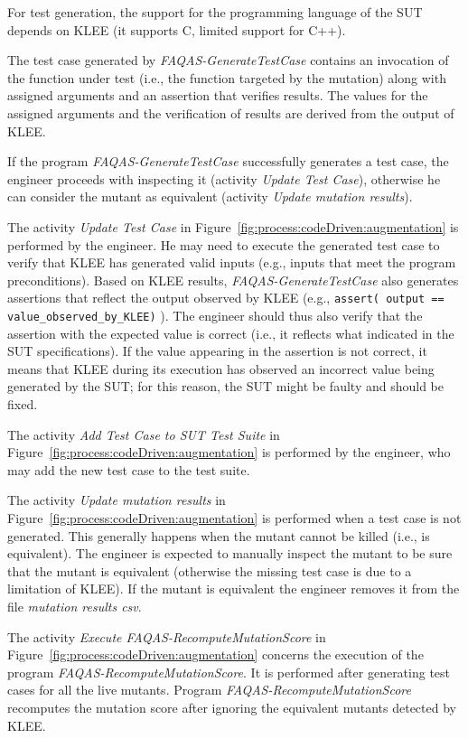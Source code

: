 For test generation, the support for the programming language of the SUT depends on KLEE (it supports C, limited support for C++).

The test case generated by \emph{FAQAS-GenerateTestCase} contains an invocation of the function under test (i.e., the function targeted  by the mutation) along with assigned arguments and an assertion that verifies results. The values for the assigned arguments and the verification of results are derived from the output of KLEE.

If the program \emph{FAQAS-GenerateTestCase} successfully generates a test case, the engineer proceeds with inspecting it (activity \emph{Update Test  Case}), otherwise he can consider the mutant as equivalent (activity \emph{Update mutation results}).

The activity \emph{Update Test  Case} in Figure~\ref{fig:process:codeDriven:augmentation} is performed by the engineer. He may need to execute the generated test case to verify that KLEE has generated valid inputs (e.g., inputs that meet the program preconditions). Based on KLEE results, \emph{FAQAS-GenerateTestCase} also generates assertions that reflect the output observed by KLEE (e.g., \texttt{assert( output == value\_observed\_by\_KLEE)} ). The engineer should thus also verify that the assertion with the expected value is correct (i.e., it reflects what indicated in the SUT specifications). If the value appearing in the assertion is not correct, it means that KLEE during its execution has observed an incorrect value being generated by the SUT; for this reason, the SUT might be faulty and should be fixed.

The activity \emph{Add Test Case to SUT Test Suite} in Figure~\ref{fig:process:codeDriven:augmentation} is performed by the engineer, who may add the new test case to the test suite.

The activity \emph{Update mutation results} in Figure~\ref{fig:process:codeDriven:augmentation} is performed when a test case is not generated. This generally happens when the mutant cannot be killed (i.e., is equivalent). The engineer is expected to manually inspect the mutant to be sure that the mutant is equivalent (otherwise the missing test case is due to a limitation of KLEE). If the mutant is equivalent the engineer removes it from the file \emph{mutation results csv}.

The activity \emph{Execute FAQAS-RecomputeMutationScore} in Figure~\ref{fig:process:codeDriven:augmentation}  concerns the execution of the program \emph{FAQAS-RecomputeMutationScore}. It is performed after generating test cases for all the live mutants. Program \emph{FAQAS-RecomputeMutationScore} recomputes the mutation score after ignoring the equivalent mutants detected by KLEE.


